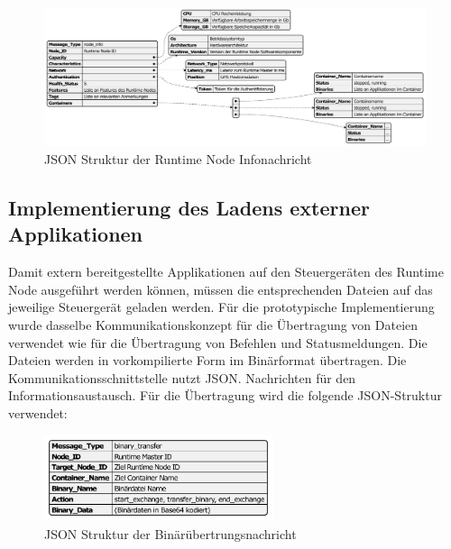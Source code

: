 \begin{figure}
	\centering
	\includegraphics[width=\textwidth]{./content/graphics/infoJSON.pdf}
	\caption{JSON Struktur der Runtime Node Infonachricht}
	\label{JSON info}
\end{figure}

\subsection{Implementierung des Ladens externer Applikationen}

Damit extern bereitgestellte Applikationen auf den Steuergeräten des Runtime Node ausgeführt werden können, müssen die entsprechenden Dateien auf das jeweilige Steuergerät geladen werden. Für die prototypische Implementierung wurde dasselbe Kommunikationskonzept für die Übertragung von Dateien verwendet wie für die Übertragung von Befehlen und Statusmeldungen. Die Dateien werden in vorkompilierte Form im Binärformat übertragen. Die Kommunikationsschnittstelle nutzt \gls{JSON}. Nachrichten für den Informationsaustausch. Für die Übertragung wird die folgende JSON-Struktur verwendet:

\begin{figure}[htbp]
	\centering
	\includegraphics[width=0.6\textwidth]{./content/graphics/binaryJSON.pdf}
	\caption{JSON Struktur der Binärübertrungsnachricht}
	\label{JSON binary}
\end{figure}


